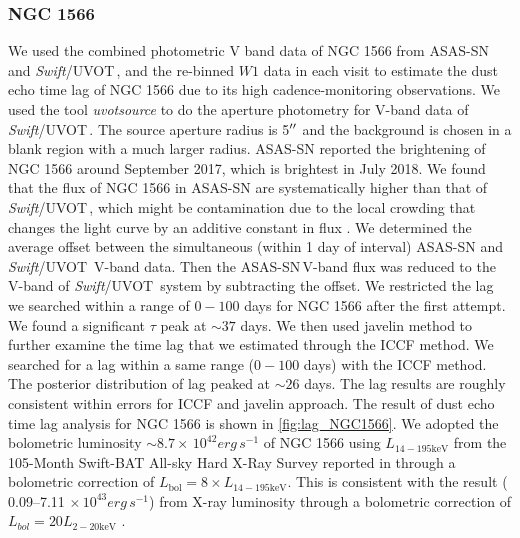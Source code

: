 \documentclass[linenumbers]{aastex631}
\newcommand{\uvot}{{\small {\it Swift}/UVOT}}
\begin{document}
\subsubsection{NGC 1566}
We used the combined photometric V band data of NGC 1566 from ASAS-SN  and \uvot\,, and the re-binned $W1$ data in each visit to estimate the dust echo time lag of NGC 1566 due to its high cadence-monitoring observations. We used the tool \textit{uvotsource} to do the aperture photometry for V-band data of \uvot\,. The source aperture radius is 5$\mbox{$^{\prime\prime}$}$ and the background is chosen in a blank region with a much larger radius. ASAS-SN \citep[][]{2018ATel11893....1D} reported the brightening of NGC 1566 around September 2017, which is brightest in July 2018. We found that the flux of NGC 1566 in ASAS-SN are systematically higher than that of \uvot\,, which might be contamination due to the local crowding that changes the light curve by an additive constant in flux   \citep[see ][]{2017PASP..129j4502K}. We determined the average offset between the simultaneous (within 1 day of interval) ASAS-SN and \uvot\, V-band data. Then the ASAS-SN\,V-band 
flux was reduced to the V-band of \uvot\, system by subtracting the offset. We restricted the lag we searched within a range of $0-100$ days for NGC 1566 after the first attempt. We found a significant $\tau$ peak at $\sim 37$ days. We then used {\sc javelin} method to further examine the time lag that we estimated through the ICCF method. We searched for a lag within a same range ($0-100$ days) with the ICCF method. The posterior distribution of lag peaked at $\sim 26$ days. The lag results are roughly consistent within errors for ICCF and {\sc javelin} approach. The result of dust echo time lag analysis for NGC 1566 is shown in \autoref{fig:lag_NGC1566}. We adopted the bolometric luminosity $\sim 8.7\times \, 10^{42} erg\, s^{-1}$ of NGC 1566 using $L_\mathrm{14-195 keV }$ from the 105-Month Swift-BAT All-sky Hard X-Ray Survey reported in \citet{2018ApJS..235....4O} through a bolometric correction of $L_{\mathrm{bol}}=8 \times L_{\mathrm{14-195 keV }}$\citep[e.g.][]{2009MNRAS.392.1124V}. This is consistent with the result ( 0.09--7.11 $\times \, 10^{43} erg\, s^{-1}$) from X-ray luminosity \citep[see][]{2021MNRAS.507..687J} through a bolometric correction of $L_{bol}=20 L_{\mathrm{2-20 keV}}$ \citep[e.g.][]{2009MNRAS.392.1124V}.
\end{document}
